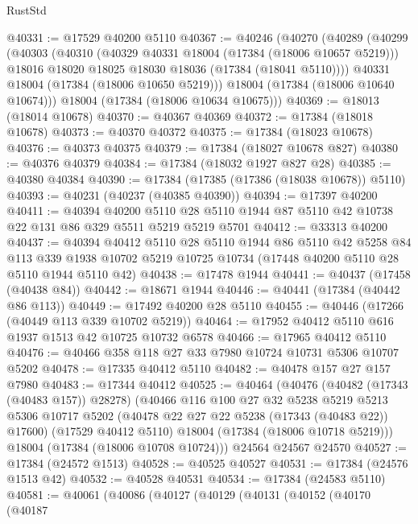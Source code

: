 \begin{lexlean}{RustStd}
\begin{coremodule}
@40331 := @17529 @40200 @5110
@40367 := @40246
    (@40270
      (@40289
        (@40299
          (@40303
            (@40310
              (@40329 @40331 @18004 (@17384 (@18006 @10657 @5219)))
              @18016
              @18020
              @18025
              @18030
              @18036
              (@17384 (@18041 @5110))))
          @40331
          @18004
          (@17384 (@18006 @10650 @5219)))
        @18004
        (@17384 (@18006 @10640 @10674)))
      @18004
      (@17384 (@18006 @10634 @10675)))
@40369 := @18013 (@18014 @10678)
@40370 := @40367 @40369
@40372 := @17384 (@18018 @10678)
@40373 := @40370 @40372
@40375 := @17384 (@18023 @10678)
@40376 := @40373 @40375
@40379 := @17384 (@18027 @10678 @827)
@40380 := @40376 @40379
@40384 := @17384 (@18032 @1927 @827 @28)
@40385 := @40380 @40384
@40390 := @17384 (@17385 (@17386 (@18038 @10678)) @5110)
@40393 := @40231 (@40237 (@40385 @40390))
@40394 := @17397 @40200
@40411 := @40394
    @40200
    @5110
    @28
    @5110
    @1944
    @87
    @5110
    @42
    @10738
    @22
    @131
    @86
    @329
    @5511
    @5219
    @5219
    @5701
@40412 := @33313 @40200
@40437 := @40394
    @40412
    @5110
    @28
    @5110
    @1944
    @86
    @5110
    @42
    @5258
    @84
    @113
    @339
    @1938
    @10702
    @5219
    @10725
    @10734
    (@17448 @40200 @5110 @28 @5110 @1944 @5110 @42)
@40438 := @17478 @1944
@40441 := @40437 (@17458 (@40438 @84))
@40442 := @18671 @1944
@40446 := @40441 (@17384 (@40442 @86 @113))
@40449 := @17492 @40200 @28 @5110
@40455 := @40446 (@17266 (@40449 @113 @339 @10702 @5219))
@40464 := @17952 @40412 @5110 @616 @1937 @1513 @42 @10725 @10732 @6578
@40466 := @17965 @40412 @5110
@40476 := @40466 @358 @118 @27 @33 @7980 @10724 @10731 @5306 @10707 @5202
@40478 := @17335 @40412 @5110
@40482 := @40478 @157 @27 @157 @7980
@40483 := @17344 @40412
@40525 := @40464
    (@40476
      (@40482 (@17343 (@40483 @157)) @28278)
      (@40466
        @116
        @100
        @27
        @32
        @5238
        @5219
        @5213
        @5306
        @10717
        @5202
        (@40478 @22 @27 @22 @5238 (@17343 (@40483 @22)) @17600)
        (@17529 @40412 @5110)
        @18004
        (@17384 (@18006 @10718 @5219)))
      @18004
      (@17384 (@18006 @10708 @10724)))
    @24564
    @24567
    @24570
@40527 := @17384 (@24572 @1513)
@40528 := @40525 @40527
@40531 := @17384 (@24576 @1513 @42)
@40532 := @40528 @40531
@40534 := @17384 (@24583 @5110)
@40581 := @40061
    (@40086
      (@40127
        (@40129
          (@40131
            (@40152
              (@40170
                (@40187

\end{coremodule}
\end{lexlean}
